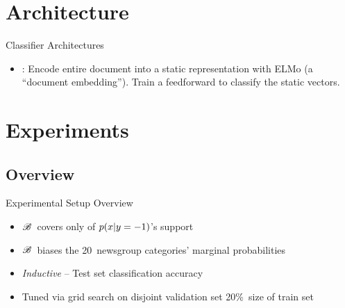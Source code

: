 \section{Architecture}
\begin{frame}{Classifier Architectures}
  \vfill
  \begin{itemize}[<+->]
    \item {}: Encode entire document into a static representation with ELMo (a ``document embedding'').  Train a feedforward to classify the static vectors.
  \end{itemize}
\end{frame}

\section{Experiments}
\subsection{Overview}
\begin{frame}{Experimental Setup Overview}
  \onslide<+->{}
  \begin{itemize}[<+->]
    \setlength{\itemsep}{6pt}
    \item $\mathscr{B}$~covers only  of ${p(x \vert y = {-}1)}$'s support
    \item $\mathscr{B}$~biases the 20~newsgroup categories' marginal probabilities
  \end{itemize}
  \vfill
  \begin{itemize}[<+->]
    \setlength{\itemsep}{6pt}
    \item \textit{Inductive} -- Test set classification accuracy
  \end{itemize}
  \vfill
  \begin{itemize}[<+->]
    \setlength{\itemsep}{6pt}
    \item Tuned via grid search on disjoint validation set 20\%~size of train set
  \end{itemize}
\end{frame}

